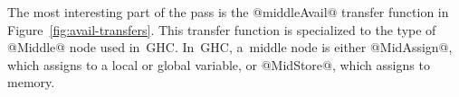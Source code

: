 \documentclass[blockstyle,preprint,natbib,nocopyrightspace]{sigplanconf}
\newcommand{\authornote}[1]{{\em #1}}
\def\authornote#1{\unskip\relax}
\newcommand{\norman}[1]{\authornote{NR: #1}}
\let\remark\norman
\newcommand{\john}[1]{\authornote{JD: #1}}
\newcommand\figref[1]{Figure~\ref{fig:#1}}
\begin{document}



The most interesting part of the pass is the @middleAvail@ transfer
function in \figref{avail-transfers}.
\remark{Let us revise the paper to pretend that global variables
don't exist.}
This transfer function is specialized to the type of @Middle@ node
used in~GHC.
In~GHC, a~middle node is either @MidAssign@, which assigns to a local
or global variable, or @MidStore@, which assigns to memory.
\par
\ifpagetuning{\enlargethispage{\baselineskip}}\fi
\end{document}
